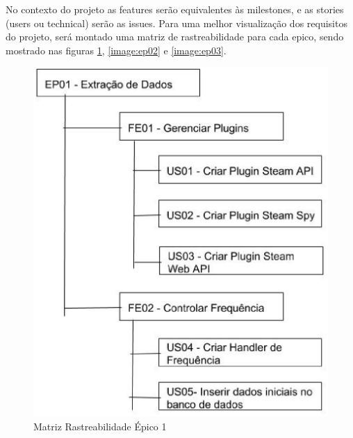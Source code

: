 No contexto do projeto as features serão equivalentes às milestones, e as stories (users ou technical) serão as issues. Para uma melhor visualização dos requisitos do projeto, será montado uma matriz de rastreabilidade para cada epico, sendo mostrado nas figuras \ref{image:ep01}, \ref{image:ep02} e \ref{image:ep03}.
\begin{figure}
\centering
\includegraphics[scale=0.35]{figuras/EP01.eps}
\caption{Matriz Rastreabilidade Épico 1}
\label{image:ep01}
\end{figure}
